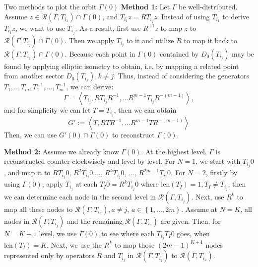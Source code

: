 \documentclass[final]{beamer}
\newlength{\onecolwid}
\begin{document}
\begin{frame}[t]
\begin{columns}[t]
\begin{column}{\onecolwid}
\begin{footnotesize}
\begin{block}{Two methods to plot the orbit $\Gamma(0)$}
\noindent\textbf{Method 1:}  Let $\Gamma$ be well-distributed. Assume $z\in\mathcal{R}(\Gamma,T_{i_1})\cap \Gamma(0)$, and $T_{i_1}z=RT_{i_j}z$. Instead of using $T_{i_1}$ to derive $T_{i_1}z$, we want to use $T_{i_j}$. As a result, first use $R^{-1}z$ to map $z$ to $\mathcal{R}(\Gamma,T_{i_j})\cap \Gamma(0)$. Then we apply $T_{i_j}$ to it and utilize $R$ to map it back to $\mathcal{R}(\Gamma,T_{i_1})\cap \Gamma(0)$. Because each point in $\Gamma(0)$ contained by $D_0(T_{i_j})$ may be found by applying elliptic isometry to obtain, i.e. by mapping a related point from another sector $D_0(T_{i_k}), k\neq j$.
Thus, instead of considering the generators $T_1,..,T_m,T_1^{-1},...,T_m^{-1}$, we can derive:
$$
\Gamma=\left\langle T_{i_j}, RT_{i_j}R^{-1},...R^{m-1}T_{i_j}R^{-(m-1)} \right\rangle,
$$
and for simplicity we can let $T=T_{i_j}$, then we can obtain
$$
G':=\left\langle T, RTR^{-1},...R^{m-1}TR^{-(m-1)} \right\rangle
$$
Then, we can use $G'(0)\cap \Gamma(0)$ to reconstruct $\Gamma(0)$.





\noindent\textbf{Method 2:} Assume we already know $\Gamma(0)$. At the highest level, $\Gamma$ is reconstructed counter-clockwisely and level by level. For $N=1$, we start with $T_{i_j}0$, and map it to $RT_{i_j}0$, $R^2T_{i_j}0$,..., $R^kT_{i_j}0$, ..., $R^{2m-1}T_{i_j}0$. For $N=2$, firstly by using $\Gamma(0)$, apply $T_{i_j}$ at each $T_I0=R^kT_{i_j}0$ where $\text{len}(T_I)=1, T_I\neq T_{i_j}$, then we can determine each node in the second level in $\mathcal{R}(\Gamma,T_{i_j})$. Next, use $R^k$ to map all these nodes to $\mathcal{R}(\Gamma,T_{i_a}), a\neq j$, $a\in\left\lbrace 1,...,2m \right\rbrace$. Assume at $N=K$, all nodes in $\mathcal{R}(\Gamma,T_{i_j})$ and the remaining $\mathcal{R}(\Gamma,T_{i_a})$ are given. Then, for $N=K+1$ level, we use $\Gamma(0)$ to see where each $T_{i_j}T_I0$ goes, when $\text{len}(T_I)=K$. Next, we use the $R^k$ to map those $(2m-1)^{K+1}$ nodes represented only by operators $R$ and $T_{i_j}$ in $\mathcal{R}(\Gamma,T_{i_j})$ to $\mathcal{R}(\Gamma,T_{i_a})$. 

\end{block}
\end{footnotesize}


\end{column}
\end{columns}
\end{frame}
\end{document}
